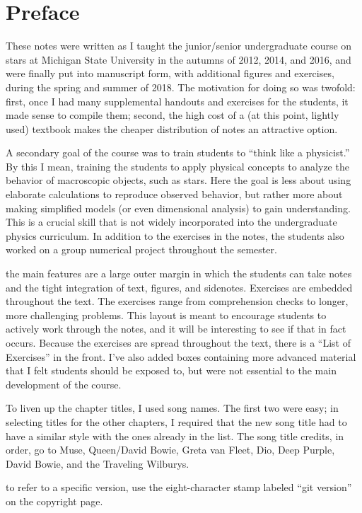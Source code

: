 
\section*{Preface}
These notes were written as I taught the junior/senior undergraduate course on stars at Michigan State University in the autumns of 2012, 2014, and 2016, and were finally put into manuscript form, with additional figures and exercises, during the spring and summer of 2018. The motivation for doing so was twofold: first, once I had many supplemental handouts and exercises for the students, it made sense to compile them; second, the high cost of a (at this point, lightly used) textbook makes the cheaper distribution of notes an attractive option.

A secondary goal of the course was to train students to ``think like a physicist.'' By this I mean, training the students to apply physical concepts to analyze the behavior of macroscopic objects, such as stars. Here the goal is less about using elaborate calculations to reproduce observed behavior, but rather more about making simplified models (or even dimensional analysis) to gain understanding. This is a crucial skill that is not widely incorporated into the undergraduate physics curriculum. In addition to the exercises in the notes, the students also worked on a group numerical project throughout the semester.

 the main features are a large outer margin in which the students can take notes and the tight integration of text, figures, and sidenotes. Exercises are embedded throughout the text. The exercises range from comprehension checks to longer, more challenging problems. This layout is meant to encourage students to actively work through the notes, and it will be interesting to see if that in fact occurs. Because the exercises are spread throughout the text, there is a ``List of Exercises'' in the front. I've also added boxes containing more advanced material that I felt students should be exposed to, but were not essential to the main development of the course. 

To liven up the chapter titles, I used song names. The first two were easy; in selecting titles for the other chapters, I required that the new song title had to have a similar style with the ones already in the list. The song title credits, in order, go to Muse, Queen/David Bowie, Greta van Fleet, Dio, Deep Purple, David Bowie, and the Traveling Wilburys.

 to refer to a specific version, use the eight-character stamp labeled ``git version'' on the copyright page.
